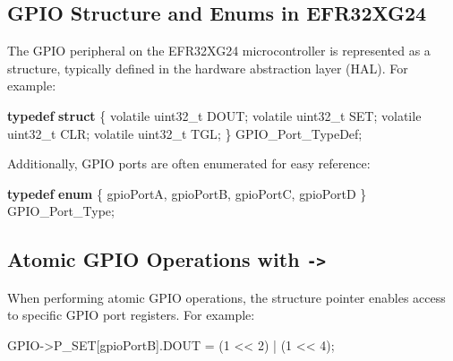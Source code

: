 \documentclass[
  9pt,
  letterpaper,
  abstract,
  titlepage]{scrbook}
\newenvironment{Shaded}{\begin{snugshade}}{\end{snugshade}}
\newcommand{\DataTypeTok}[1]{\textcolor[rgb]{0.68,0.00,0.00}{#1}}
\newcommand{\DecValTok}[1]{\textcolor[rgb]{0.68,0.00,0.00}{#1}}
\newcommand{\KeywordTok}[1]{\textcolor[rgb]{0.00,0.23,0.31}{\textbf{#1}}}
\newcommand{\NormalTok}[1]{\textcolor[rgb]{0.00,0.23,0.31}{#1}}
\newcommand{\OperatorTok}[1]{\textcolor[rgb]{0.37,0.37,0.37}{#1}}
\begin{document}
\subsection{GPIO Structure and Enums in
EFR32XG24}\label{gpio-structure-and-enums-in-efr32xg24}

The GPIO peripheral on the EFR32XG24 microcontroller is represented as a
structure, typically defined in the hardware abstraction layer (HAL).
For example:

\begin{Shaded}
\begin{Highlighting}[]
\KeywordTok{typedef} \KeywordTok{struct} \OperatorTok{\{}
    \DataTypeTok{volatile} \DataTypeTok{uint32\_t}\NormalTok{ DOUT}\OperatorTok{;}
    \DataTypeTok{volatile} \DataTypeTok{uint32\_t}\NormalTok{ SET}\OperatorTok{;}
    \DataTypeTok{volatile} \DataTypeTok{uint32\_t}\NormalTok{ CLR}\OperatorTok{;}
    \DataTypeTok{volatile} \DataTypeTok{uint32\_t}\NormalTok{ TGL}\OperatorTok{;}
\OperatorTok{\}}\NormalTok{ GPIO\_Port\_TypeDef}\OperatorTok{;}
\end{Highlighting}
\end{Shaded}

Additionally, GPIO ports are often enumerated for easy reference:

\begin{Shaded}
\begin{Highlighting}[]
\KeywordTok{typedef} \KeywordTok{enum} \OperatorTok{\{}
\NormalTok{    gpioPortA}\OperatorTok{,}
\NormalTok{    gpioPortB}\OperatorTok{,}
\NormalTok{    gpioPortC}\OperatorTok{,}
\NormalTok{    gpioPortD}
\OperatorTok{\}}\NormalTok{ GPIO\_Port\_Type}\OperatorTok{;}
\end{Highlighting}
\end{Shaded}

\subsection{\texorpdfstring{Atomic GPIO Operations with
\texttt{-\textgreater{}}}{Atomic GPIO Operations with -\textgreater{}}}\label{atomic-gpio-operations-with--}

When performing atomic GPIO operations, the structure pointer enables
access to specific GPIO port registers. For example:

\begin{Shaded}
\begin{Highlighting}[]
\NormalTok{GPIO}\OperatorTok{{-}\textgreater{}}\NormalTok{P\_SET}\OperatorTok{[}\NormalTok{gpioPortB}\OperatorTok{].}\NormalTok{DOUT }\OperatorTok{=} \OperatorTok{(}\DecValTok{1} \OperatorTok{\textless{}\textless{}} \DecValTok{2}\OperatorTok{)} \OperatorTok{|} \OperatorTok{(}\DecValTok{1} \OperatorTok{\textless{}\textless{}} \DecValTok{4}\OperatorTok{);}
\end{Highlighting}
\end{Shaded}
\end{document}

